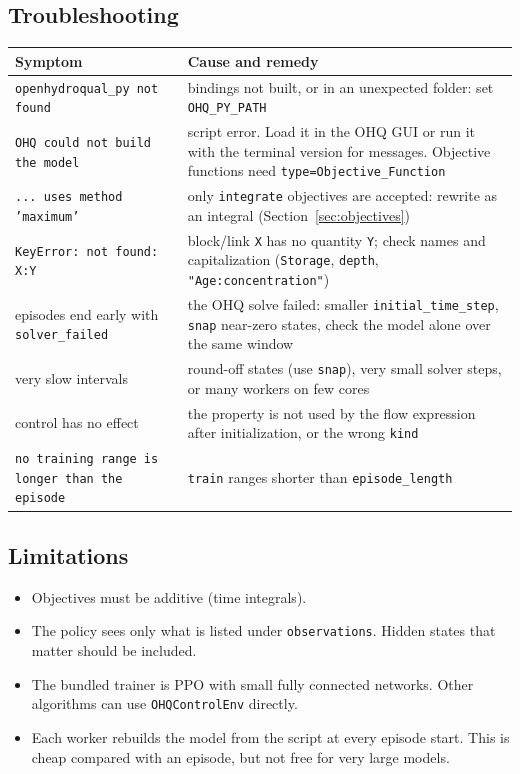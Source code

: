 \documentclass[11pt]{article}
\newcommand{\code}[1]{\texttt{#1}}
\begin{document}
\subsection{Troubleshooting}
\begin{center}\small
\begin{longtable}{@{}p{5.3cm}p{9.2cm}@{}}
\toprule
Symptom & Cause and remedy\\
\midrule
\endhead
\code{openhydroqual\_py not found} & bindings not built, or in an unexpected folder: set \code{OHQ\_PY\_PATH}\\
\code{OHQ could not build the model} & script error. Load it in the OHQ GUI or run it with the terminal version for messages. Objective functions need \code{type=Objective\_Function}\\
\code{... uses method 'maximum'} & only \code{integrate} objectives are accepted: rewrite as an integral (Section~\ref{sec:objectives})\\
\code{KeyError: not found: X:Y} & block/link \code{X} has no quantity \code{Y}; check names and capitalization (\code{Storage}, \code{depth}, \code{"Age:concentration"})\\
episodes end early with \code{solver\_failed} & the OHQ solve failed: smaller \code{initial\_time\_step}, \code{snap} near-zero states, check the model alone over the same window\\
very slow intervals & round-off states (use \code{snap}), very small solver steps, or many workers on few cores\\
control has no effect & the property is not used by the flow expression after initialization, or the wrong \code{kind}\\
\code{no training range is longer than the episode} & \code{train} ranges shorter than \code{episode\_length}\\
\bottomrule
\end{longtable}
\end{center}

\subsection{Limitations}
\begin{itemize}[nosep]
\item Objectives must be additive (time integrals).
\item The policy sees only what is listed under \code{observations}. Hidden
  states that matter should be included.
\item The bundled trainer is PPO with small fully connected networks.
  Other algorithms can use \code{OHQControlEnv} directly.
\item Each worker rebuilds the model from the script at every episode
  start. This is cheap compared with an episode, but not free for very
  large models.
\end{itemize}
\end{document}
